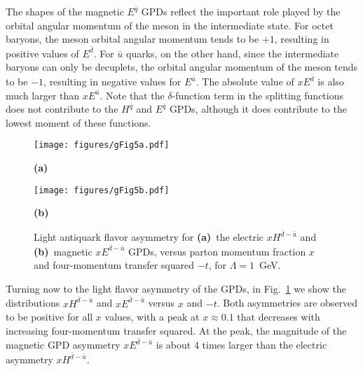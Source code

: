 \documentclass[preprintnumbers,prd,superscriptaddress,preprint]{revtex4-1}
\begin{document}
The shapes of the magnetic $E^{\bar{q}}$ GPDs reflect the important role played by the orbital angular momentum of the meson in the intermediate state.
For octet baryons, the meson orbital angular momentum tends to be $+1$, resulting in positive values of $E^{\bar{d}}$.
For $\bar u$ quarks, on the other hand, since the intermediate baryons can only be decuplets, the orbital angular momentum of the meson tends to be $-1$, resulting in negative values for $E^{\bar{u}}$.
The absolute value of $xE^{\bar{d}}$ is also much larger than $xE^{\bar{u}}$.
Note that the $\delta$-function term in the splitting functions does not contribute to the $H^{\bar{q}}$ and $E^{\bar{q}}$ GPDs, although it does contribute to the lowest moment of these functions.


\begin{figure}[] %
\begin{center}
    \begin{minipage}{0.45\linewidth}
        \centering
        \centerline{
        \texttt{[image: figures/gFig5a.pdf]}
        }
        \centerline{\small{\bf{(a)}}}
    \end{minipage}
    \begin{minipage}{0.45\linewidth}
        \centering
        \centerline{
        \texttt{[image: figures/gFig5b.pdf]}
        }
        \centerline{\small{\bf{(b)}}}
    \end{minipage}
\caption{Light antiquark flavor asymmetry for {\bf (a)}~the electric $xH^{\bar{d}-\bar{u}}$ and {\bf (b)}~magnetic $xE^{\bar{d}-\bar{u}}$ GPDs, versus parton momentum fraction $x$ and four-momentum transfer squared $-t$, for \mbox{$\Lambda = 1$~GeV.}} 
\label{3du-d} 
\end{center}
\end{figure}


Turning now to the light flavor asymmetry of the GPDs, in Fig.~\ref{3du-d} we show the distributions $xH^{\bar{d}-\bar{u}}$ and $xE^{\bar{d}-\bar{u}}$ versus $x$ and $-t$.
Both asymmetries are observed to be positive for all $x$ values, with a peak at $x \approx 0.1$ that decreases with increasing four-momentum transfer squared.
At the peak, the magnitude of the magnetic GPD asymmetry $xE^{\bar{d}-\bar{u}}$ is about 4 times larger than the electric asymmetry $xH^{\bar{d}-\bar{u}}$.
\end{document}
